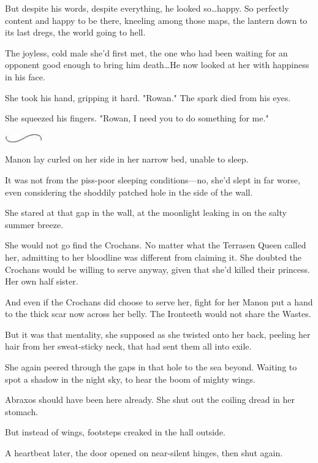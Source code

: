 But despite his words, despite everything, he looked so\ldots happy.
So perfectly content and happy to be there, kneeling among those maps, the lantern down to its last dregs, the world going to hell.

The joyless, cold male she'd first met, the one who had been waiting for an opponent good enough to bring him death\ldots He now looked at her with happiness in his face.

She took his hand, gripping it hard.
"Rowan."
The spark died from his eyes.

She squeezed his fingers.
"Rowan, I need you to do something for me."

\begin{center}
	\includegraphics[width=0.65in,height=0.13in]{images/seperator}
\end{center}

Manon lay curled on her side in her narrow bed, unable to sleep.

It was not from the piss-poor sleeping conditions---no, she'd slept in far worse, even considering the shoddily patched hole in the side of the wall.

She stared at that gap in the wall, at the moonlight leaking in on the salty summer breeze.

She would not go find the Crochans.
No matter what the Terrasen Queen called her, admitting to her bloodline was different from 
claiming it.
She doubted the Crochans would be willing to serve anyway, given that she'd killed their princess.
Her own half sister.

And even if the Crochans did choose to serve her, fight for her 
Manon put a hand to the thick scar now across her belly.
The Ironteeth would not share the Wastes.

But it was that mentality, she supposed as she twisted onto her back, peeling her hair from her sweat-sticky neck, that had sent them all into exile.

She again peered through the gaps in that hole to the sea beyond.
Waiting to spot a shadow in the night sky, to hear the boom of mighty wings.

Abraxos should have been here already.
She shut out the coiling dread in her stomach.

But instead of wings, footsteps creaked in the hall outside.

A heartbeat later, the door opened on near-silent hinges, then shut again.

